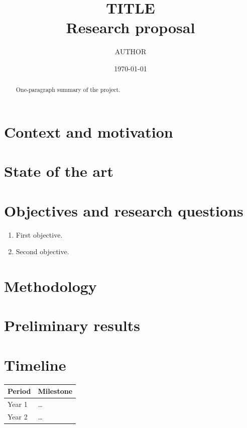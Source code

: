 \documentclass[11pt]{article}
\title{{{TITLE}}\\[4pt]\large Research proposal}
\author{{{AUTHOR}}}
\date{\today}
\theoremstyle{plain}
\theoremstyle{definition}
\theoremstyle{remark}
\begin{document}
\maketitle
\begin{abstract}
One-paragraph summary of the project.
\end{abstract}
\section{Context and motivation}
\section{State of the art}
\section{Objectives and research questions}
\begin{enumerate}
  \item First objective.
  \item Second objective.
\end{enumerate}
\section{Methodology}
\section{Preliminary results}
\section{Timeline}
\begin{tabular}{ll}\toprule
Period & Milestone\\\midrule
Year 1 & \dots\\
Year 2 & \dots\\\bottomrule
\end{tabular}


\end{document}
